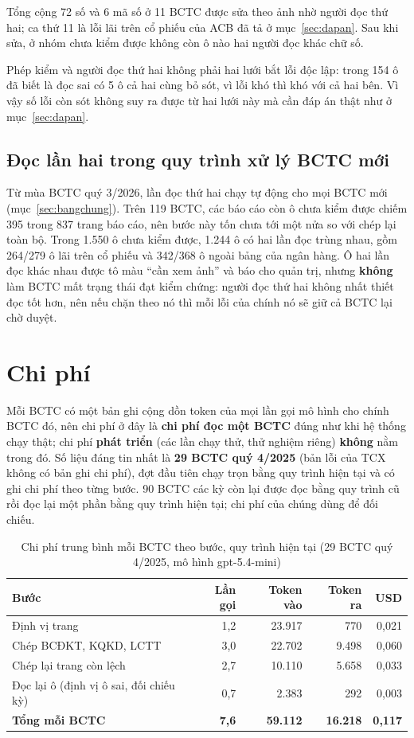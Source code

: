 \documentclass[12pt,a4paper]{report}
\newcommand{\enquote}[1]{“#1”}
\begin{document}
Tổng cộng 72 số và 6 mã số ở 11 BCTC được sửa theo ảnh nhờ người đọc thứ hai; ca thứ 11 là lỗi lãi trên cổ phiếu của ACB
đã tả ở mục~\ref{sec:dapan}. Sau khi sửa, ở nhóm chưa kiểm được không còn ô nào hai người đọc khác chữ số.

Phép kiểm và người đọc thứ hai không phải hai lưới bắt lỗi độc lập: trong 154 ô đã biết là đọc sai có 5 ô cả hai cùng
bỏ sót, vì lỗi khó thì khó với cả hai bên. Vì vậy số lỗi còn sót không suy ra được từ hai lưới này mà cần đáp án thật
như ở mục~\ref{sec:dapan}.

\subsection{Đọc lần hai trong quy trình xử lý BCTC mới}
Từ mùa BCTC quý 3/2026, lần đọc thứ hai chạy tự động cho mọi BCTC mới (mục~\ref{sec:bangchung}). Trên 119 BCTC, các báo
cáo còn ô chưa kiểm được chiếm 395 trong 837 trang báo cáo, nên bước này tốn chưa tới một nửa so với chép lại toàn bộ.
Trong 1.550 ô chưa kiểm được, 1.244 ô có hai lần đọc trùng nhau, gồm 264/279 ô lãi trên cổ phiếu và 342/368 ô ngoài
bảng của ngân hàng. Ô hai lần đọc khác nhau được tô màu \enquote{cần xem ảnh} và báo cho quản trị, nhưng \textbf{không}
làm BCTC mất trạng thái đạt kiểm chứng: người đọc thứ hai không nhất thiết đọc tốt hơn, nên nếu chặn theo nó thì mỗi
lỗi của chính nó sẽ giữ cả BCTC lại chờ duyệt.

\section{Chi phí}
Mỗi BCTC có một bản ghi cộng dồn token của mọi lần gọi mô hình cho chính BCTC đó, nên chi phí ở đây là \textbf{chi phí
đọc một BCTC} đúng như khi hệ thống chạy thật; chi phí \textbf{phát triển} (các lần chạy thử, thử nghiệm riêng)
\textbf{không} nằm trong đó. Số liệu đáng tin nhất là \textbf{29 BCTC quý 4/2025} (bản lỗi của TCX không có bản ghi chi
phí), đợt đầu tiên chạy trọn bằng quy trình hiện tại và có ghi chi phí theo từng bước. 90 BCTC các kỳ còn lại được đọc
bằng quy trình cũ rồi đọc lại một phần bằng quy trình hiện tại; chi phí của chúng dùng để đối chiếu.

\begin{table}[H]
\centering\small
\caption{Chi phí trung bình mỗi BCTC theo bước, quy trình hiện tại (29 BCTC quý 4/2025, mô hình gpt-5.4-mini)}\label{tab:chiphi}
\begin{tabular}{@{}lrrrr@{}}
\toprule
\textbf{Bước} & \textbf{Lần gọi} & \textbf{Token vào} & \textbf{Token ra} & \textbf{USD} \\ \midrule
Định vị trang & 1,2 & 23.917 & 770 & 0,021 \\
Chép BCĐKT, KQKD, LCTT & 3,0 & 22.702 & 9.498 & 0,060 \\
Chép lại trang còn lệch & 2,7 & 10.110 & 5.658 & 0,033 \\
Đọc lại ô (định vị ô sai, đối chiếu kỳ) & 0,7 & 2.383 & 292 & 0,003 \\ \midrule
\textbf{Tổng mỗi BCTC} & \textbf{7,6} & \textbf{59.112} & \textbf{16.218} & \textbf{0,117} \\
\bottomrule
\end{tabular}
\end{table}
\end{document}
